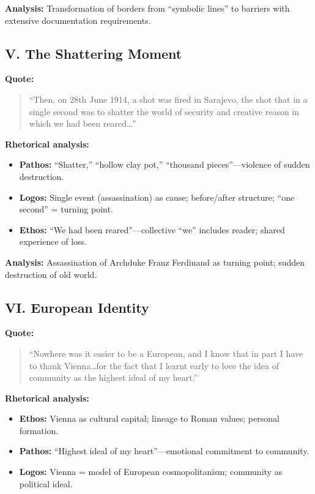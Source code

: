 \documentclass[11pt,a4paper]{article}
\begin{document}
\textbf{Analysis:} Transformation of borders from ``symbolic lines'' to barriers with extensive documentation requirements.

\subsection*{V. The Shattering Moment}

\textbf{Quote:}
\begin{quote}
``Then, on 28th June 1914, a shot was fired in Sarajevo, the shot that in a single second was to shatter the world of security and creative reason in which we had been reared\ldots''
\end{quote}

\textbf{Rhetorical analysis:}
\begin{itemize}
\item \textbf{Pathos:} ``Shatter,'' ``hollow clay pot,'' ``thousand pieces''---violence of sudden destruction.
\item \textbf{Logos:} Single event (assassination) as cause; before/after structure; ``one second'' = turning point.
\item \textbf{Ethos:} ``We had been reared''---collective ``we'' includes reader; shared experience of loss.
\end{itemize}

\textbf{Analysis:} Assassination of Archduke Franz Ferdinand as turning point; sudden destruction of old world.

\subsection*{VI. European Identity}

\textbf{Quote:}
\begin{quote}
``Nowhere was it easier to be a European, and I know that in part I have to thank Vienna\ldots for the fact that I learnt early to love the idea of community as the highest ideal of my heart.''
\end{quote}

\textbf{Rhetorical analysis:}
\begin{itemize}
\item \textbf{Ethos:} Vienna as cultural capital; lineage to Roman values; personal formation.
\item \textbf{Pathos:} ``Highest ideal of my heart''---emotional commitment to community.
\item \textbf{Logos:} Vienna = model of European cosmopolitanism; community as political ideal.
\end{itemize}
\end{document}
